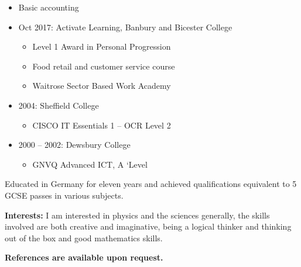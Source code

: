 \documentclass[10pt,a4paper]{book}
\begin{document}
\begin{flushleft}
\begin{itemize}
\begin{itemize}
    \item Basic accounting
    \end{itemize}
    \end{itemize}
    \begin{itemize}
      \item Oct 2017: Activate Learning, Banbury and Bicester College
      \begin{itemize}
    \item Level 1 Award in Personal Progression

    \item Food retail and customer service course

    \item Waitrose Sector Based Work Academy
    \end{itemize}
  \end{itemize}
  \begin{itemize}
  \item 2004: Sheffield College
\begin{itemize}
    \item CISCO IT Essentials 1 -- OCR Level 2
    \end{itemize}
  \end{itemize}
  \begin{itemize}
  \item 2000 -- 2002: Dewsbury College
    \begin{itemize}
    \item GNVQ Advanced ICT, A `Level
    \end{itemize}
    \end{itemize}
Educated in Germany for eleven years and achieved qualifications
equivalent to 5 GCSE passes in various subjects.
\linebreak{}

\textbf {Interests:}
I am interested in physics and the sciences generally, the skills involved are both creative and imaginative, being a logical thinker and thinking out of the box and good mathematics skills.
\linebreak{}

\textbf {References are available upon request.}
\end{flushleft}
\end{document}
